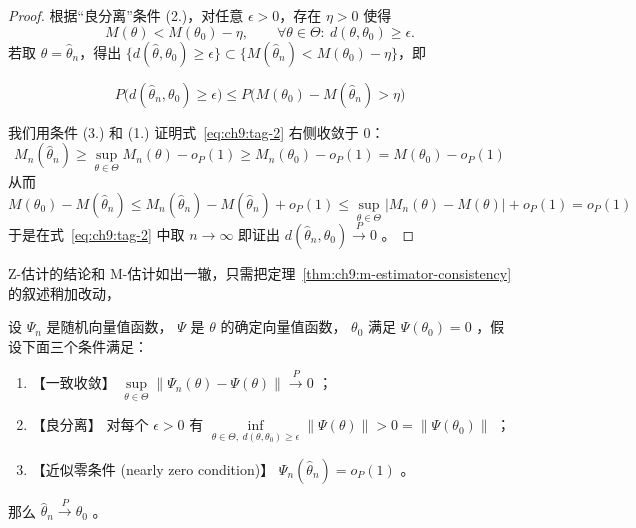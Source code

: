 \begin{proof}

根据``良分离''条件 (2.)，对任意 $\epsilon>0$，存在 $\eta>0$ 使得
\[
M(\theta)<M(\theta_0)-\eta,\qquad
\forall \theta\in\Theta:\ d(\theta,\theta_0)\ge\epsilon.
\]
若取 $\theta=\widehat\theta_n$，得出 $\big\{d(\widehat\theta,\theta_0)\ge \epsilon\big\}\subset \big\{M(\widehat\theta_n)<M(\theta_0)-\eta\big\}$，即

\begin{equation}
\label{eq:ch9:tag-2}
P\big(d(\widehat\theta_n,\theta_0)\ge\epsilon\big)\le P\big(M(\theta_0)-M(\widehat\theta_n)>\eta\big)
\end{equation}

我们用条件 (3.) 和 (1.) 证明式~\eqref{eq:ch9:tag-2} 右侧收敛于 0：\[ M_n(\widehat\theta_n)\ge\sup\limits_{\theta\in\Theta}M_n(\theta)-o_P(1)\ge M_n(\theta_0)-o_P(1)=M(\theta_0)-o_P(1) \]从而\[M(\theta_0)-M(\widehat\theta_n)\le M_n(\widehat\theta_n)-M(\widehat\theta_n)+o_P(1)\le \sup\limits_{\theta\in\Theta}|M_n(\theta)-M(\theta)|+o_P(1)=o_P(1)\]
于是在式~\eqref{eq:ch9:tag-2} 中取 $n\to\infty$ 即证出 $d(\widehat\theta_n,\theta_0)\overset P\to 0$ 。

\end{proof}

Z-估计的结论和 M-估计如出一辙，只需把定理~\ref{thm:ch9:m-estimator-consistency} 的叙述稍加改动，

\begin{theorem}[Z-估计的相合性]\label{thm:ch9:z-estimator-consistency}

设 $\Psi_n$ 是随机向量值函数， $\Psi$ 是 $\theta$ 的确定向量值函数， $\theta_0$ 满足 $\Psi(\theta_0)=0$ ，假设下面三个条件满足：

\begin{enumerate}
\def\labelenumi{\arabic{enumi}.}
\tightlist
\item
  【一致收敛】 $\sup\limits_{\theta\in\Theta}\|\Psi_n(\theta)-\Psi(\theta)\|\overset P\to 0$ ；
\item
  【良分离】 对每个 $\epsilon>0$ 有 $\inf\limits_{\theta\in\Theta,\ d(\theta,\theta_0)\ge\epsilon}\|\Psi(\theta)\|>0=\|\Psi(\theta_0)\|$ ；
\item
  【近似零条件 (nearly zero condition)】 $\Psi_n(\widehat\theta_n)=o_P(1)$ 。
\end{enumerate}

那么 $\widehat\theta_n\overset P\to \theta_0$ 。

\end{theorem}

